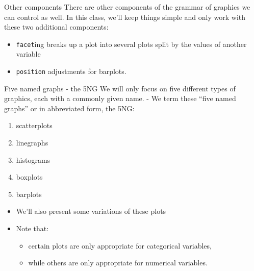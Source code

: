 \documentclass[
  ignorenonframetext,
]{beamer}
\providecommand{\tightlist}{%
  \setlength{\itemsep}{0pt}\setlength{\parskip}{0pt}}
\begin{document}
\begin{frame}[fragile]{Other components}
\protect\hypertarget{other-components}{}
There are other components of the grammar of graphics we can control as
well. In this class, we'll keep things simple and only work with these
two additional components:

\begin{itemize}
\item
  \texttt{facet}ing breaks up a plot into several plots split by the
  values of another variable
\item
  \texttt{position} adjustments for barplots.
\end{itemize}
\end{frame}

\begin{frame}{Five named graphs - the 5NG}
\protect\hypertarget{five-named-graphs---the-5ng}{}
We will only focus on five different types of graphics, each with a
commonly given name. - We term these ``five named graphs'' or in
abbreviated form, the 5NG:

\begin{enumerate}
\tightlist
\item
  scatterplots
\item
  linegraphs
\item
  histograms
\item
  boxplots
\item
  barplots
\end{enumerate}

\begin{itemize}
\item
  We'll also present some variations of these plots
\item
  Note that:

  \begin{itemize}
  \tightlist
  \item
    certain plots are only appropriate for categorical variables,
  \item
    while others are only appropriate for numerical variables.
  \end{itemize}
\end{itemize}
\end{frame}
\end{document}
